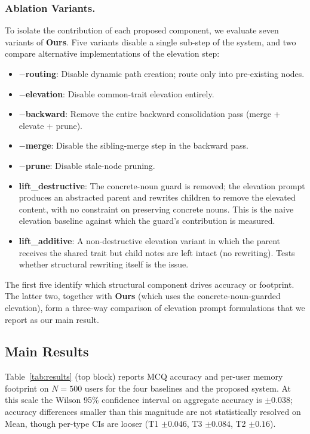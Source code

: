 \documentclass[sigconf,review,anonymous]{acmart}
\begin{document}
\subsubsection{Ablation Variants.}
To isolate the contribution of each proposed component, we evaluate seven variants of \textbf{Ours}. Five variants disable a single sub-step of the system, and two compare alternative implementations of the elevation step:
\begin{itemize}
    \item \textbf{$-$routing}: Disable dynamic path creation; route only into pre-existing nodes.
    \item \textbf{$-$elevation}: Disable common-trait elevation entirely.
    \item \textbf{$-$backward}: Remove the entire backward consolidation pass (merge + elevate + prune).
    \item \textbf{$-$merge}: Disable the sibling-merge step in the backward pass.
    \item \textbf{$-$prune}: Disable stale-node pruning.
    \item \textbf{lift\_destructive}: The concrete-noun guard is removed; the elevation prompt produces an abstracted parent and rewrites children to remove the elevated content, with no constraint on preserving concrete nouns. This is the naive elevation baseline against which the guard's contribution is measured.
    \item \textbf{lift\_additive}: A non-destructive elevation variant in which the parent receives the shared trait but child notes are left intact (no rewriting). Tests whether structural rewriting itself is the issue.
\end{itemize}
The first five identify which structural component drives accuracy or footprint. The latter two, together with \textbf{Ours} (which uses the concrete-noun-guarded elevation), form a three-way comparison of elevation prompt formulations that we report as our main result.



\subsection{Main Results}
\label{sec:main-results}

Table~\ref{tab:results} (top block) reports MCQ accuracy and per-user memory footprint on \(N{=}500\) users for the four baselines and the proposed system. At this scale the Wilson 95\% confidence interval on aggregate accuracy is \(\pm 0.038\); accuracy differences smaller than this magnitude are not statistically resolved on Mean, though per-type CIs are looser (T1 \(\pm 0.046\), T3 \(\pm 0.084\), T2 \(\pm 0.16\)).
\end{document}
